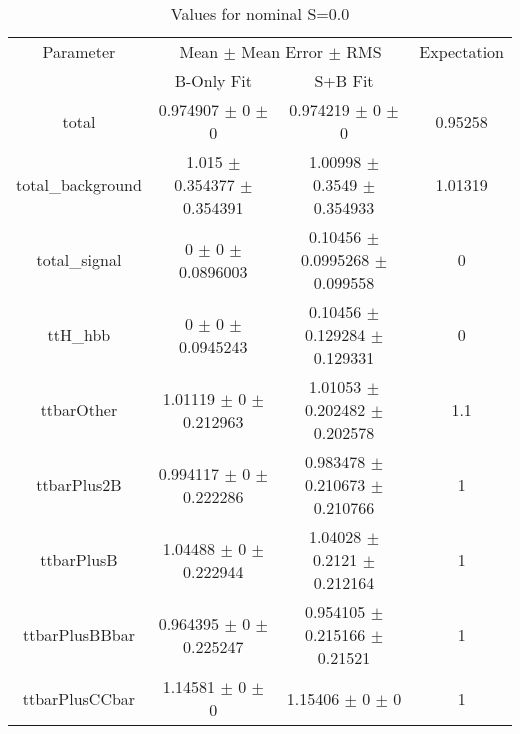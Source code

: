 \begin{table}
\centering
\caption{Values for nominal S=0.0}
\begin{tabular}{cccc}
\toprule
Parameter & \multicolumn{2}{c}{Mean $\pm$ Mean Error $\pm$ RMS} & Expectation\\
 & B-Only Fit & S+B Fit & \\
\midrule
total & \num{0.974907} $\pm$ \num{0} $\pm$ \num{0} & \num{0.974219} $\pm$ \num{0} $\pm$ \num{0} & \num{0.95258}\\
total\_background & \num{1.015} $\pm$ \num{0.354377} $\pm$ \num{0.354391} & \num{1.00998} $\pm$ \num{0.3549} $\pm$ \num{0.354933} & \num{1.01319}\\
total\_signal & \num{0} $\pm$ \num{0} $\pm$ \num{0.0896003} & \num{0.10456} $\pm$ \num{0.0995268} $\pm$ \num{0.099558} & \num{0}\\
ttH\_hbb & \num{0} $\pm$ \num{0} $\pm$ \num{0.0945243} & \num{0.10456} $\pm$ \num{0.129284} $\pm$ \num{0.129331} & \num{0}\\
ttbarOther & \num{1.01119} $\pm$ \num{0} $\pm$ \num{0.212963} & \num{1.01053} $\pm$ \num{0.202482} $\pm$ \num{0.202578} & \num{1.1}\\
ttbarPlus2B & \num{0.994117} $\pm$ \num{0} $\pm$ \num{0.222286} & \num{0.983478} $\pm$ \num{0.210673} $\pm$ \num{0.210766} & \num{1}\\
ttbarPlusB & \num{1.04488} $\pm$ \num{0} $\pm$ \num{0.222944} & \num{1.04028} $\pm$ \num{0.2121} $\pm$ \num{0.212164} & \num{1}\\
ttbarPlusBBbar & \num{0.964395} $\pm$ \num{0} $\pm$ \num{0.225247} & \num{0.954105} $\pm$ \num{0.215166} $\pm$ \num{0.21521} & \num{1}\\
ttbarPlusCCbar & \num{1.14581} $\pm$ \num{0} $\pm$ \num{0} & \num{1.15406} $\pm$ \num{0} $\pm$ \num{0} & \num{1}\\
\bottomrule
\end{tabular}
\end{table}
